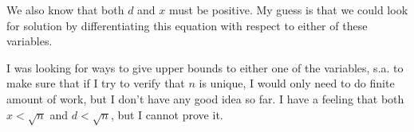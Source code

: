 \documentclass[11pt]{article}
\begin{document}
We also know that both \(d\) and \(x\) must be positive.  My guess is that we
could look for solution by differentiating this equation with respect to
either of these variables.

I was looking for ways to give upper bounds to either one of the variables,
s.a. to make sure that if I try to verify that \(n\) is unique, I would only
need to do finite amount of work, but I don't have any good idea so far.  I
have a feeling that both \(x < \sqrt{n}\) and \(d < \sqrt{n}\), but I cannot
prove it.
\end{document}
